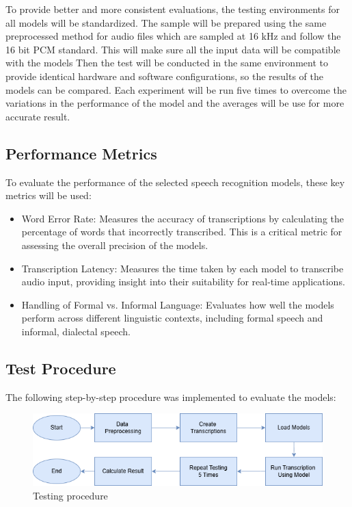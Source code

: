 To provide better and more consistent evaluations, the testing environments for all models will be standardized. The sample will be prepared using the same preprocessed method for audio files which are sampled at 16 kHz and follow the 16 bit PCM standard. This will make sure all the input data will be compatible with the models Then the test will be conducted in the same environment to provide identical hardware and software configurations, so the results of the models can be compared. Each experiment will be run five times to overcome the variations in the performance of the model and the averages will be use for more accurate result.


\subsection{Performance Metrics}
To evaluate the performance of the selected speech recognition models, these key metrics will be used:

\begin{itemize}
    \item Word Error Rate: Measures the accuracy of transcriptions by calculating the percentage of words that incorrectly transcribed. This is a critical metric for assessing the overall precision of the models.
    \item Transcription Latency: Measures the time taken by each model to transcribe audio input, providing insight into their suitability for real-time applications.
    \item Handling of Formal vs. Informal Language: Evaluates how well the models perform across different linguistic contexts, including formal speech and informal, dialectal speech.
\end{itemize}

\subsection{Test Procedure}
The following step-by-step procedure was implemented to evaluate the models:

\begin{figure}[!ht]
    \centering
    \includegraphics[width=1\textwidth]{mainmatter//images/step.png}
    \caption{Testing procedure }
\end{figure}


